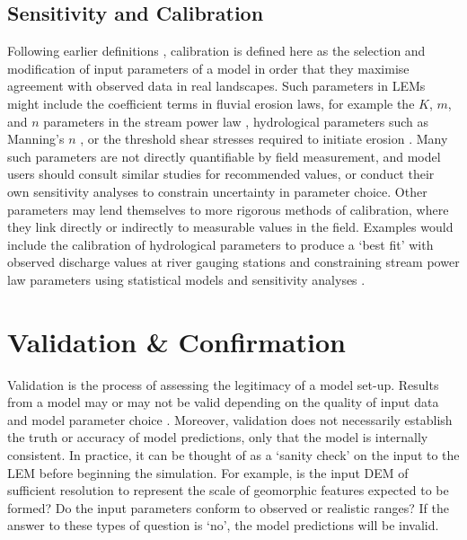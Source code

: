 \subsection{Sensitivity and Calibration}
Following earlier definitions \citep{oreskes1994verification,Trucano2006}, calibration is defined here as the selection and modification of input parameters of a model in order that they maximise agreement with observed data in real landscapes. Such parameters in LEMs might include the coefficient terms in fluvial erosion laws, for example the \(K\), \(m\), and \(n\) parameters in the stream power law \citep{seidl1992problem}, hydrological parameters such as Manning's \(n\) \citep{manning1890flow}, or the threshold shear stresses required to initiate erosion \citep{snyder2003importance}. Many such parameters are not directly quantifiable by field measurement, and model users should consult similar studies for recommended values, or conduct their own sensitivity analyses to constrain uncertainty in parameter choice. Other parameters may lend themselves to more rigorous methods of calibration, where they link directly or indirectly to measurable values in the field. Examples would include the calibration of hydrological parameters to produce a `best fit' with observed discharge values at river gauging stations \citep{Coulthard2013,wong2015sensitivity} and constraining stream power law parameters using statistical models and sensitivity analyses \citep{Croissant2014,Mudd2014}.

\section{Validation \& Confirmation}
Validation is the process of assessing the legitimacy of a model set-up. Results from a model may or may not be valid depending on the quality of input data and model parameter choice \citep{oreskes1994verification}. Moreover, validation does not necessarily establish the truth or accuracy of model predictions, only that the model is internally consistent. In practice, it can be thought of as a `sanity check' on the input to the LEM before beginning the simulation. For example, is the input DEM of sufficient resolution to represent the scale of geomorphic features expected to be formed? Do the input parameters conform to observed or realistic ranges? If the answer to these types of question is `no', the model predictions will be invalid. 

